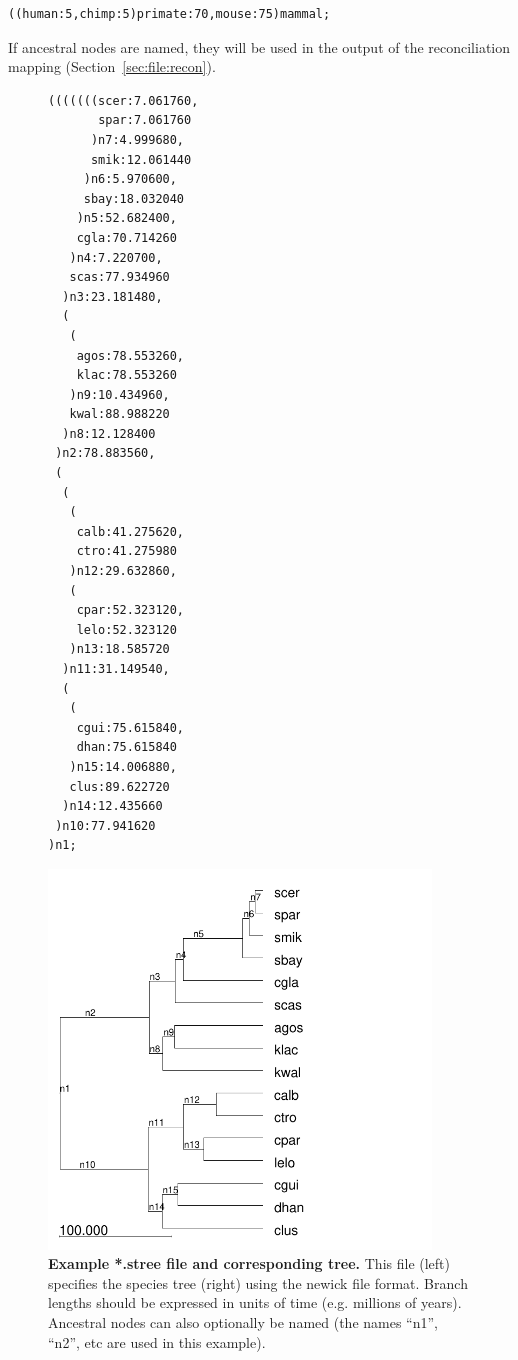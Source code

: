 \documentclass[11pt]{article}
\newcommand{\secref}[1]{Section~\ref{#1}}
\begin{document}
\begin{lstlisting}
((human:5,chimp:5)primate:70,mouse:75)mammal;
\end{lstlisting}

If ancestral nodes are named, they will be used in the output of the 
reconciliation mapping (\secref{sec:file:recon}).



\begin{figure}
\begin{center}

\begin{minipage}{2in}
\tiny
\begin{lstlisting}[frame=tblr]
(((((((scer:7.061760,
       spar:7.061760
      )n7:4.999680,
      smik:12.061440
     )n6:5.970600,
     sbay:18.032040
    )n5:52.682400,
    cgla:70.714260
   )n4:7.220700,
   scas:77.934960
  )n3:23.181480,
  (
   (
    agos:78.553260,
    klac:78.553260
   )n9:10.434960,
   kwal:88.988220
  )n8:12.128400
 )n2:78.883560,
 (
  (
   (
    calb:41.275620,
    ctro:41.275980
   )n12:29.632860,
   (
    cpar:52.323120,
    lelo:52.323120
   )n13:18.585720
  )n11:31.149540,
  (
   (
    cgui:75.615840,
    dhan:75.615840
   )n15:14.006880,
   clus:89.622720
  )n14:12.435660
 )n10:77.941620
)n1;
\end{lstlisting}
\end{minipage} \hfill \begin{minipage}{4in}
\hspace{.5in}
\includegraphics[width=4in]{figures/fungi-stree.pdf}
\end{minipage}


\end{center}

\caption{{\bf Example *.stree file and corresponding tree.} This file
(left) specifies the species tree (right) using the newick file
format.  Branch lengths should be expressed in units of time
(e.g. millions of years).  Ancestral nodes can also optionally be
named (the names ``n1'', ``n2'', etc are used in this example).}
\label{fig:stree}
\end{figure}
\end{document}
